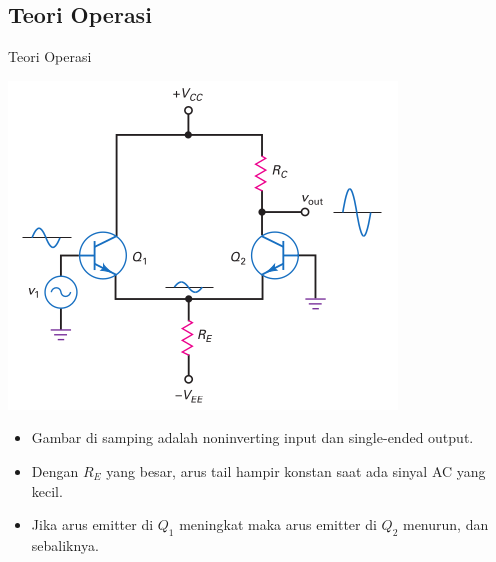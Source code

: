 \documentclass[aspectratio=169]{beamer}
\begin{document}
\subsection{Teori Operasi}
\begin{frame}{Teori Operasi}
	\begin{multicols}{2}
		\begin{center}
			\includegraphics[height=0.7\textheight]{gambar/01.noninverting-input+single-ended-output_AC}
		\end{center}
		\columnbreak
		\begin{itemize}
			\item Gambar di samping adalah noninverting input dan single-ended output.
			\item Dengan $ R_E $ yang besar, arus tail hampir konstan saat ada sinyal AC yang kecil.
			\item Jika arus emitter di $ Q_1 $ meningkat maka arus emitter di  $ Q_2 $ menurun, dan sebaliknya.
		\end{itemize}
	\end{multicols}
\end{frame}
\end{document}
